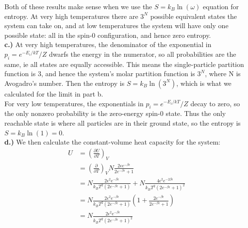 \documentclass[10pt]{article} %
\begin{document}
Both of these results make sense when we use the $S=k_B\ln\left(\omega\right)$
equation for entropy. At very high temperatures there are $3^N$ possible
equivalent states the system can take on, and at low temperatures the system will
have only one possible state: all in the spin-0 configuration, and hence zero
entropy.\\

\textbf{c.)} At very high temperatures, the denominator of the exponential
in $p_i = e^{-E_i/kT}/Z$ dwarfs the energy in the numerator, so all probabilities
are the same, ie all states are equally accessible. This means the single-particle
partition function is $3$, and hence the system's molar partition function is
$3^N$, where N is Avogadro's number. Then the entropy is
$S = k_B\ln\left(3^N\right)$, which is what we calculated for the limit in part b.\\

For very low temperatures, the exponentials in $p_i = e^{-E_i/kT}/Z$ decay to zero,
so the only nonzero probability is the zero-energy spin-0 state. Thus the only
reachable state is where all particles are in their ground state, so the entropy
is $S = k_B\ln\left(1\right) = 0$.\\

\textbf{d.)} We then calculate the constant-volume heat capacity for the
system:\\


\begin{align*}
  U &= \left(\frac{\partial U}{\partial T}\right)_V\\
  &= \left(\frac{\partial}{\partial T}\right)_V
  N\frac{2\epsilon e^{-\beta\epsilon}}{2e^{-\beta\epsilon} + 1}\\
  &= N\frac{2\epsilon^2 e^{-\beta\epsilon}}{k_BT^2\left(2e^{-\beta\epsilon} + 1\right)}
  + N\frac{4\epsilon^2e^{-2\beta\epsilon}}{k_BT^2(2e^{-\beta\epsilon} + 1)^2}\\
  &= N\frac{2\epsilon^2 e^{-\beta\epsilon}}{k_BT^2\left(2e^{-\beta\epsilon} + 1\right)}
  \left(1 + \frac{2e^{-\beta\epsilon}}{2e^{-\beta\epsilon} + 1}\right)\\
  &= N\frac{2\epsilon^2 e^{-\beta\epsilon}}{k_BT^2\left(2e^{-\beta\epsilon} + 1\right)^2}
\end{align*}
\end{document}
